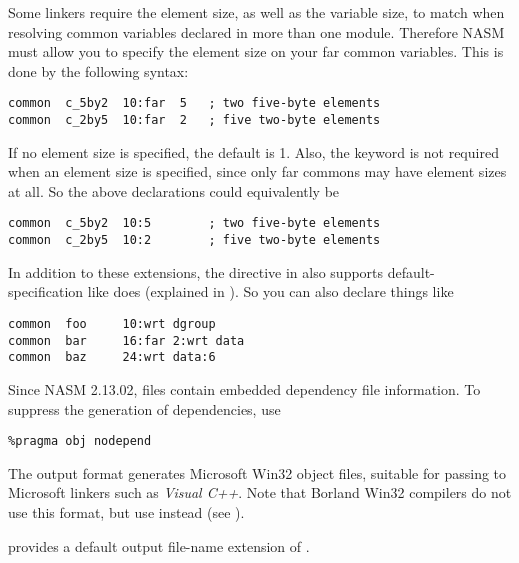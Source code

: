 Some  linkers require the element size, as well as
the variable size, to match when resolving common variables declared
in more than one module. Therefore NASM must allow you to specify
the element size on your far common variables. This is done by the
following syntax:

\begin{lstlisting}
common  c_5by2  10:far  5   ; two five-byte elements
common  c_2by5  10:far  2   ; five two-byte elements
\end{lstlisting}

If no element size is specified, the default is 1. Also, the 
keyword is not required when an element size is specified, since
only far commons may have element sizes at all. So the above
declarations could equivalently be

\begin{lstlisting}
common  c_5by2  10:5        ; two five-byte elements
common  c_2by5  10:2        ; five two-byte elements
\end{lstlisting}

In addition to these extensions, the  directive
in  also supports default- specification
like  does (explained in ).
So you can also declare things like

\begin{lstlisting}
common  foo     10:wrt dgroup
common  bar     16:far 2:wrt data
common  baz     24:wrt data:6
\end{lstlisting}


Since NASM 2.13.02,  files contain embedded dependency file
information. To suppress the generation of dependencies, use

\begin{lstlisting}
%pragma obj nodepend
\end{lstlisting}


The  output format generates Microsoft Win32 object files,
suitable for passing to Microsoft linkers such as \emph{Visual C++}.
Note that Borland Win32 compilers do not use this format, but use
 instead (see ).

 provides a default output file-name extension of .

